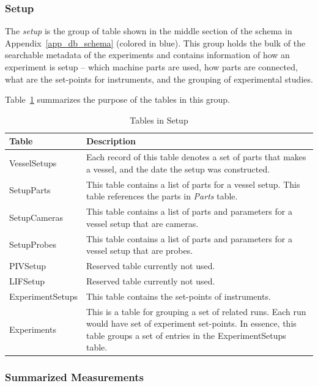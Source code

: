 \subsubsection{Setup}

The \emph{setup} is the group of table shown in the middle section of the schema in Appendix~\ref{app_db_schema} (colored in blue). This group holds the bulk of the searchable metadata of the experiments and contains information of how an experiment is setup -- which machine parts are used, how parts are connected, what are the set-points for instruments, and the grouping of experimental studies.

Table~\ref{tb_tables_in_setup} summarizes the purpose of the tables in this group.

\begin{table}[h]
\centering
\caption{Tables in Setup}\label{tb_tables_in_setup}
\begin{tabular}{l p{12cm}} \hline
{\bf Table}         & {\bf Description}\\ \hline
VesselSetups    & Each record of this table denotes a set of parts that makes a vessel, and the date the setup was constructed.\\ \hline
SetupParts      & This table contains a list of parts for a vessel setup. This table references the parts in \emph{Parts} table.\\ \hline
SetupCameras    & This table contains a list of parts and parameters for a vessel setup that are cameras. \\ \hline
SetupProbes     &This table contains a list of parts and parameters for a vessel setup that are probes. \\ \hline
PIVSetup        & Reserved table currently not used.\\ \hline
LIFSetup        & Reserved table currently not used.\\ \hline
ExperimentSetups    & This table contains the set-points of instruments.\\ \hline
Experiments     & This is a table for grouping a set of related runs. Each run would have set of experiment set-points. In essence, this table groups a set of entries in the ExperimentSetups table.\\ \hline
\end{tabular}
\end{table}


\subsubsection{Summarized Measurements}

